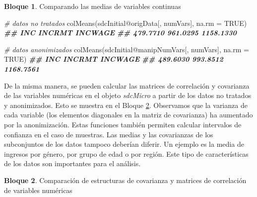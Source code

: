 \documentclass[
]{book}
\newenvironment{Shaded}{\begin{snugshade}}{\end{snugshade}}
\newcommand{\AttributeTok}[1]{\textcolor[rgb]{0.77,0.63,0.00}{#1}}
\newcommand{\CommentTok}[1]{\textcolor[rgb]{0.56,0.35,0.01}{\textit{#1}}}
\newcommand{\ConstantTok}[1]{\textcolor[rgb]{0.00,0.00,0.00}{#1}}
\newcommand{\DocumentationTok}[1]{\textcolor[rgb]{0.56,0.35,0.01}{\textbf{\textit{#1}}}}
\newcommand{\FunctionTok}[1]{\textcolor[rgb]{0.00,0.00,0.00}{#1}}
\newcommand{\NormalTok}[1]{#1}
\newcommand{\SpecialCharTok}[1]{\textcolor[rgb]{0.00,0.00,0.00}{#1}}
\theoremstyle{definition}
\theoremstyle{definition}
\newtheorem{example}{Bloque}[chapter]
\theoremstyle{definition}
\theoremstyle{definition}
\theoremstyle{remark}
\begin{document}
\begin{example}
\protect\hypertarget{exm:bloque5lbn}{}\label{exm:bloque5lbn}Comparando las medias de variables continuas
\end{example}

\begin{Shaded}
\begin{Highlighting}[]
\CommentTok{\# datos no tratados}
\FunctionTok{colMeans}\NormalTok{(sdcInitial}\SpecialCharTok{@}\NormalTok{origData[, numVars], }\AttributeTok{na.rm =} \ConstantTok{TRUE}\NormalTok{)}
\DocumentationTok{\#\#       INC    INCRMT   INCWAGE}
\DocumentationTok{\#\#  479.7710  961.0295 1158.1330}

\CommentTok{\# datos anonimizados}
\FunctionTok{colMeans}\NormalTok{(sdcInitial}\SpecialCharTok{@}\NormalTok{manipNumVars[, numVars], }\AttributeTok{na.rm =} \ConstantTok{TRUE}\NormalTok{)}
\DocumentationTok{\#\#       INC    INCRMT   INCWAGE}
\DocumentationTok{\#\#  489.6030  993.8512 1168.7561}
\end{Highlighting}
\end{Shaded}

De la misma manera, se pueden calcular las matrices de correlación y covarianza de las variables numéricas en el objeto \emph{sdcMicro} a partir de los datos no tratados y anonimizados. Esto se muestra en el Bloque \ref{exm:bloque6lbn}. Observamos que la varianza de cada variable (los elementos diagonales en la matriz de covarianza) ha aumentado por la anonimización. Estas funciones también permiten calcular intervalos de confianza en el caso de muestras. Las medias y las covarianzas de los subconjuntos de los datos tampoco deberían diferir. Un ejemplo es la media de ingresos por género, por grupo de edad o por región. Este tipo de características de los datos son importantes para el análisis.

\begin{example}
\protect\hypertarget{exm:bloque6lbn}{}\label{exm:bloque6lbn}Comparación de estructuras de covarianza y matrices de correlación de variables numéricas
\end{example}
\end{document}
